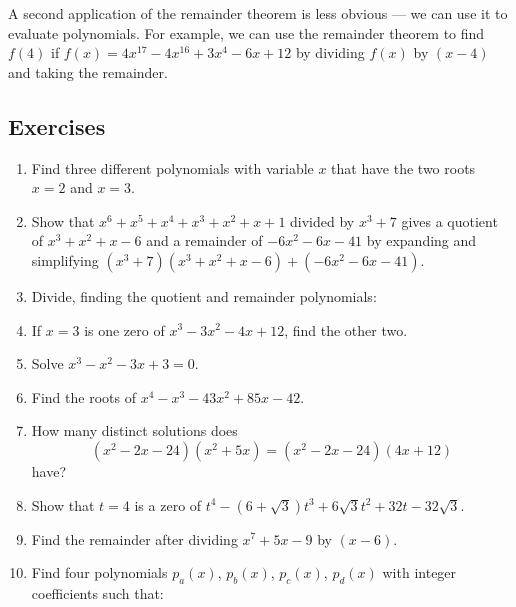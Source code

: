 \documentclass[a4paper,10pt,titlepage]{article}
\theoremstyle{definition}
\begin{document}
A second application of the remainder theorem is less obvious --- we can
use it to evaluate polynomials. For example, we can use the remainder theorem
to find $ f(4) $ if $ f(x) = 4x^{17} - 4x^{16} + 3x^4 - 6x + 12 $ by dividing $ f(x) $
by $ (x - 4) $ and taking the remainder.

\subsection*{Exercises}
\begin{enumerate}
  \item Find three different polynomials with variable $ x $ that have the two roots $ x = 2 $ and $ x = 3 $.
  \item Show that $ x^6 + x^5 + x^4 + x^3 + x^2 + x + 1 $ divided by $ x^3 + 7 $ gives
        a quotient of $ x^3 + x^2 + x - 6 $ and a remainder of $ -6x^2 - 6x - 41 $ by
        expanding and simplifying $ (x^3 + 7)(x^3 + x^2 + x - 6) + (-6x^2 - 6x - 41) $.
  \item Divide, finding the quotient and remainder polynomials:
  \item If $ x = 3 $ is one zero of $ x^3 - 3x^2 - 4x + 12 $, find the other two.
  \item Solve $ x^3 - x^2 - 3x + 3 = 0 $.
  \item Find the roots of $ x^4 - x^3 - 43x^2 + 85x - 42 $.
  \item How many distinct solutions does
        \begin{displaymath}
          (x^2 - 2x - 24)(x^2 + 5x) = (x^2 - 2x - 24)(4x + 12)
        \end{displaymath}
        have?
  \item Show that $ t = 4 $ is a zero of $ t^4 - (6 + \sqrt{3})t^3 + 6\sqrt{3}t^2 + 32t -32\sqrt{3} $.
  \item Find the remainder after dividing $ x^7 + 5x - 9 $ by $ (x-6) $.
  \item Find four polynomials $ p_a(x) $, $ p_b(x) $, $ p_c(x) $, $ p_d(x) $ with integer coefficients such that:
\end{enumerate}
\end{document}
